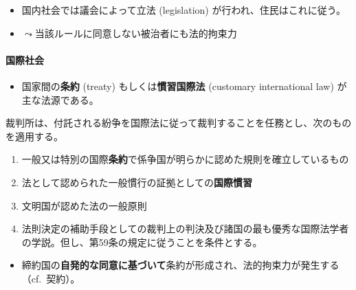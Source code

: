 \documentclass[
  xelatex,
  ja=standard]{bxjsarticle}
\let\oldparagraph\paragraph
\renewcommand{\paragraph}[1]{\oldparagraph{#1}\mbox{}}
\providecommand{\tightlist}{%
  \setlength{\itemsep}{0pt}\setlength{\parskip}{0pt}}\usepackage{longtable,booktabs,array}
\begin{document}
\begin{itemize}
\tightlist
\item
  国内社会では議会によって立法 (legislation)
  が行われ、住民はこれに従う。
\item
  \(\leadsto\)当該ルールに同意しない被治者にも法的拘束力
\end{itemize}

\hypertarget{ux56fdux969bux793eux4f1a}{%
\paragraph{国際社会}\label{ux56fdux969bux793eux4f1a}}

\begin{itemize}
\tightlist
\item
  国家間の\textbf{条約} (treaty) もしくは\textbf{慣習国際法} (customary
  international law) が主な法源である。
\end{itemize}

\begin{tcolorbox}[enhanced jigsaw, titlerule=0mm, colback=white, coltitle=black, title=\textcolor{quarto-callout-note-color}{\faInfo}\hspace{0.5em}{\href{https://www.unic.or.jp/info/un/un_organization/icj/statute/}{国際司法裁判所規程}　第38条1項}, leftrule=.75mm, bottomrule=.15mm, left=2mm, arc=.35mm, breakable, colbacktitle=quarto-callout-note-color!10!white, toprule=.15mm, rightrule=.15mm, opacityback=0, bottomtitle=1mm, colframe=quarto-callout-note-color-frame, toptitle=1mm, opacitybacktitle=0.6]

裁判所は、付託される紛争を国際法に従って裁判することを任務とし、次のものを適用する。

\begin{enumerate}
\def\labelenumi{\alph{enumi}.}
\tightlist
\item
  一般又は特別の国際\textbf{条約}で係争国が明らかに認めた規則を確立しているもの
\item
  法として認められた一般慣行の証拠としての\textbf{国際慣習}
\item
  文明国が認めた法の一般原則
\item
  法則決定の補助手段としての裁判上の判決及び諸国の最も優秀な国際法学者の学説。但し、第59条の規定に従うことを条件とする。
\end{enumerate}

\end{tcolorbox}

\begin{itemize}
\tightlist
\item
  締約国の\textbf{自発的な同意に基づいて}条約が形成され、法的拘束力が発生する（cf.~契約）。
\end{itemize}
\end{document}
